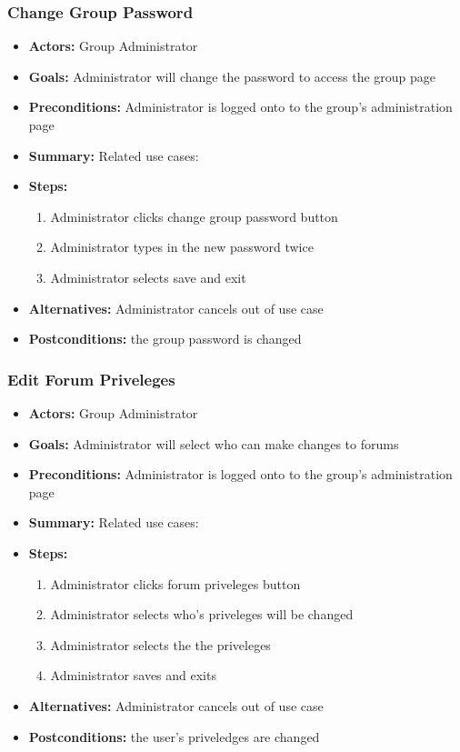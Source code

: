 \documentclass[12pt, oneside, letterpaper]{report}
\begin{document}
			\subsubsection{Change Group Password}
			\begin{itemize}
				\item{\textbf{Actors:} Group Administrator}
				\item{\textbf{Goals:} Administrator will change the password to access the group page}
				\item{\textbf{Preconditions:} Administrator is logged onto to the group's administration page}
				\item{\textbf{Summary:} Related use cases:}
				\item{\textbf{Steps:}
				\begin{enumerate}
					\item{Administrator clicks change group password button}
					\item{Administrator types in the new password twice}
					\item{Administrator selects save and exit}
				\end{enumerate}
				}
				\item{\textbf{Alternatives:} Administrator cancels out of use case}
				\item{\textbf{Postconditions:} the group password is changed}
			\end{itemize}
			\subsubsection{Edit Forum Priveleges}
			\begin{itemize}
				\item{\textbf{Actors:} Group Administrator}
				\item{\textbf{Goals:} Administrator will select who can make changes to forums}
				\item{\textbf{Preconditions:} Administrator is logged onto to the group's administration page}
				\item{\textbf{Summary:} Related use cases:}
				\item{\textbf{Steps:}
				\begin{enumerate}
					\item{Administrator clicks forum priveleges button}
					\item{Administrator selects who's priveleges will be changed}
					\item{Administrator selects the the priveleges}
					\item{Administrator saves and exits}
				\end{enumerate}
				}
				\item{\textbf{Alternatives:} Administrator cancels out of use case}
				\item{\textbf{Postconditions:} the user's priveledges are changed}
			\end{itemize}
\end{document}
